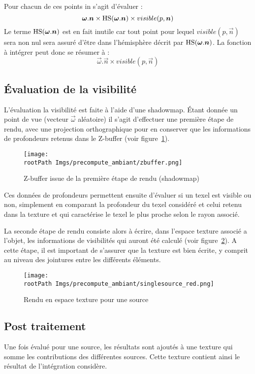 \documentclass[10pt,a4paper,twoside, twocolumn]{report}
\newcommand*{\rootPath}{../}
\begin{document}
Pour chacun de ces points in s’agit d'évaluer :
	$$\vec\omega.\vec n\times \Hs(\vec \omega.\vec n)\times visible(p, \vec n)$$
Le terme $\Hs(\vec \omega.\vec n)$ est en fait inutile car tout point pour lequel $visible(p, \vec n)$ sera non nul sera assuré d’être dans l’hémisphère décrit par $\Hs(\vec \omega.\vec n)$. La fonction à intégrer peut donc se résumer à :
	$$\vec\omega.\vec n\times visible(p, \vec n)$$

\subsection{Évaluation de la visibilité}
L'évaluation la visibilité est faite à l'aide d'une shadowmap. Étant donnée un point de vue (vecteur $\vec\omega$ aléatoire) il s’agit d’effectuer une première étape de rendu, avec une projection orthographique pour en conserver que les informations de profondeurs retenus dans le Z-buffer (voir figure~\ref{fig:precompute_ambiant:zbuffer}).

\begin{figure}[!ht]\centering
	\texttt{[image: \\rootPath Imgs/precompute\_ambiant/zbuffer.png]}
	\caption{Z-buffer issue de la première étape de rendu (shadowmap)}
	\label{fig:precompute_ambiant:zbuffer}
\end{figure}


Ces données de profondeurs permettent ensuite d'évaluer si un texel est visible ou non, simplement en comparant la profondeur du texel considéré et celui retenu dans la texture et qui caractérise le texel le plus proche selon le rayon associé.

La seconde étape de rendu consiste alors à écrire, dans l’espace texture associé a l'objet, les informations de visibilités qui auront été calculé (voir figure~\ref{fig:precompute_ambiant:singlesource}). A cette étape, il est important de s'assurer que la texture est bien écrite, y comprit au niveau des jointures entre les différents éléments.

\begin{figure}[!ht]\centering
	\texttt{[image: \\rootPath Imgs/precompute\_ambiant/singlesource\_red.png]}
	\caption{Rendu en espace texture pour une source}
	\label{fig:precompute_ambiant:singlesource}
\end{figure}

\subsection{Post traitement}
Une fois évalué pour une source, les résultats sont ajoutés à une texture qui somme les contributions des différentes sources. Cette texture contient ainsi le résultat de l'intégration considère.
\end{document}
